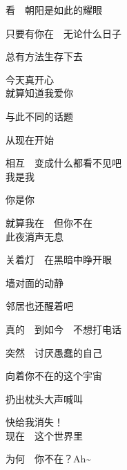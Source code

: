 看　朝阳是如此的耀眼

只要有你在　无论什么日子

总有方法生存下去

今天真开心
\\

就算知道我爱你

与此不同的话题

从现在开始

相互　变成什么都看不见吧
\\

我是我

你是你

就算我在　但你不在
\\

此夜消声无息

关着灯　在黑暗中睁开眼

墙对面的动静

邻居也还醒着吧

真的　到如今　不想打电话

突然　讨厌愚蠢的自己

向着你不在的这个宇宙

扔出枕头大声喊叫

快给我消失！
\\

现在　这个世界里

为何　你不在？Ah\textasciitilde
\\
